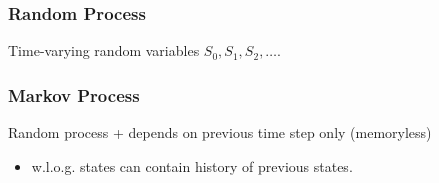 \subsubsection{Random Process}
\begin{definition}
    Time-varying random variables $S_0, S_1, S_2, \ldots$.
\end{definition}

\subsubsection{Markov Process}
\begin{definition}
    Random process + depends on previous time step only (memoryless)
    \begin{itemize}
        \item w.l.o.g. states can contain history of previous states.
    \end{itemize}
\end{definition}

